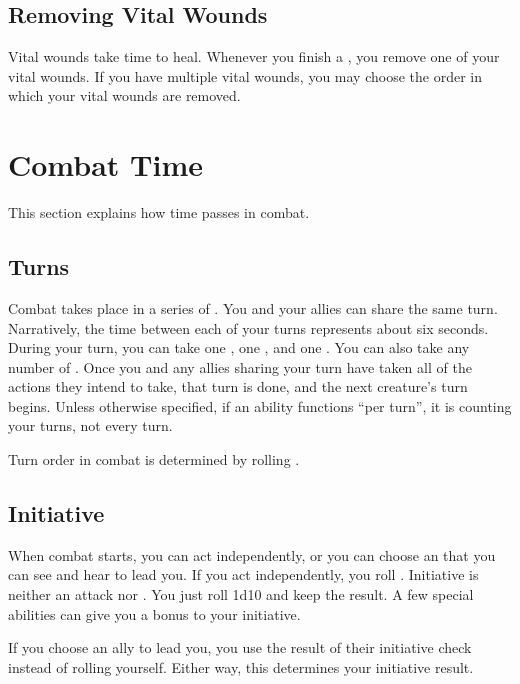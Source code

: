   \subsection{Removing Vital Wounds}\label{Removing Vital Wounds}
    Vital wounds take time to heal.
    Whenever you finish a , you remove one of your vital wounds.
    If you have multiple vital wounds, you may choose the order in which your vital wounds are removed.

\section{Combat Time}\label{Combat Time}
  This section explains how time passes in combat.

  \subsection{Turns}\label{Turns}
    Combat takes place in a series of .
    You and your allies can share the same turn.
    Narratively, the time between each of your turns represents about six seconds.
    During your turn, you can take one , one , and one .
    You can also take any number of .
    Once you and any allies sharing your turn have taken all of the actions they intend to take, that turn is done, and the next creature's turn begins.
    Unless otherwise specified, if an ability functions ``per turn'', it is counting your turns, not every turn.

    Turn order in combat is determined by rolling .

  \subsection{Initiative}\label{Initiative}
    When combat starts, you can act independently, or you can choose an  that you can see and hear to lead you.
    If you act independently, you roll .
    Initiative is neither an attack nor .
    You just roll 1d10 and keep the result.
    A few special abilities can give you a bonus to your initiative.

    If you choose an ally to lead you, you use the result of their initiative check instead of rolling yourself.
    Either way, this determines your initiative result.

